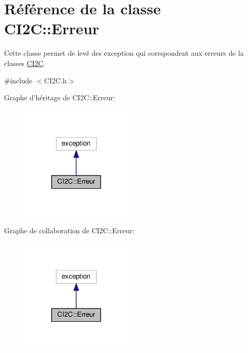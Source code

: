 \hypertarget{class_c_i2_c_1_1_erreur}{\section{Référence de la classe C\+I2\+C\+:\+:Erreur}
\label{class_c_i2_c_1_1_erreur}
}


Cette classe permet de levé des exception qui corrspondent aux erreurs de la classes \hyperlink{class_c_i2_c}{C\+I2\+C}.  




{\ttfamily \#include $<$C\+I2\+C.\+h$>$}



Graphe d'héritage de C\+I2\+C\+:\+:Erreur\+:\nopagebreak
\begin{figure}[H]
\begin{center}
\leavevmode
\includegraphics[width=152pt]{class_c_i2_c_1_1_erreur__inherit__graph}
\end{center}
\end{figure}


Graphe de collaboration de C\+I2\+C\+:\+:Erreur\+:\nopagebreak
\begin{figure}[H]
\begin{center}
\leavevmode
\includegraphics[width=152pt]{class_c_i2_c_1_1_erreur__coll__graph}
\end{center}
\end{figure}
